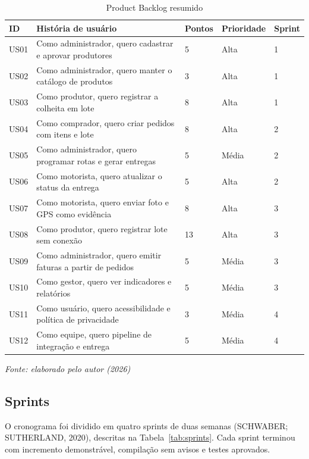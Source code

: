\begin{table}[htbp]
  \centering
  \caption{Product Backlog resumido}
  \label{tab:backlog}
  \fontsize{9}{11}\selectfont
  \begin{tabular}{L{1.2cm}L{6.6cm}L{1.6cm}L{2.0cm}L{2.0cm}}
    \toprule
    \textbf{ID} & \textbf{História de usuário} & \textbf{Pontos} & \textbf{Prioridade} & \textbf{Sprint} \\
    \midrule
    US01 & Como administrador, quero cadastrar e aprovar produtores & 5 & Alta & 1 \\
    US02 & Como administrador, quero manter o catálogo de produtos & 3 & Alta & 1 \\
    US03 & Como produtor, quero registrar a colheita em lote & 8 & Alta & 1 \\
    US04 & Como comprador, quero criar pedidos com itens e lote & 8 & Alta & 2 \\
    US05 & Como administrador, quero programar rotas e gerar entregas & 5 & Média & 2 \\
    US06 & Como motorista, quero atualizar o status da entrega & 5 & Alta & 2 \\
    US07 & Como motorista, quero enviar foto e GPS como evidência & 8 & Alta & 3 \\
    US08 & Como produtor, quero registrar lote sem conexão & 13 & Alta & 3 \\
    US09 & Como administrador, quero emitir faturas a partir de pedidos & 5 & Média & 3 \\
    US10 & Como gestor, quero ver indicadores e relatórios & 5 & Média & 3 \\
    US11 & Como usuário, quero acessibilidade e política de privacidade & 3 & Média & 4 \\
    US12 & Como equipe, quero pipeline de integração e entrega & 5 & Média & 4 \\
    \bottomrule
  \end{tabular}

  \vspace{2pt}
  {\fontsize{9}{11}\selectfont\itshape Fonte: elaborado pelo autor (2026)}
\end{table}

\subsection{Sprints}

O cronograma foi dividido em quatro sprints de duas semanas (SCHWABER;
SUTHERLAND, 2020), descritas na Tabela~\ref{tab:sprints}. Cada sprint terminou com incremento demonstrável,
compilação sem avisos e testes aprovados.

